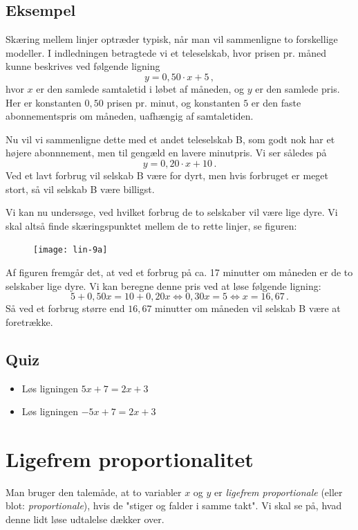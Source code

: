 \documentclass[12pt,oneside,a4paper]{article}
\begin{document}
\subsection{Eksempel}
Skæring mellem linjer optræder typisk, når man vil sammenligne to forskellige
modeller.  I indledningen betragtede vi et teleselskab, hvor prisen pr. måned
kunne beskrives ved følgende ligning
\[
    y = 0,50 \cdot x + 5 \,,
\]
hvor $x$ er den samlede samtaletid i løbet af måneden, og $y$ er den samlede
pris. Her er konstanten $0,50$ prisen pr. minut, og konstanten $5$ er den faste
abonnementspris om måneden, uafhængig af samtaletiden.

Nu vil vi sammenligne dette med et andet teleselskab B, som godt nok har et
højere abonnnement, men til gengæld en lavere minutpris. Vi ser således på
\[
    y = 0,20 \cdot x + 10 \,.
\]
Ved et lavt forbrug vil selskab B være for dyrt, men hvis forbruget er meget stort, så vil
selskab B være billigst.

Vi kan nu undersøge, ved hvilket forbrug de to selskaber vil være lige dyre. Vi skal 
altså finde skæringspunktet mellem de to rette linjer, se figuren:
\begin{figure}[H]
    \centering
    \texttt{[image: lin-9a]}
    \caption{}
\end{figure}
Af figuren fremgår det, at ved et forbrug på ca. 17 minutter om måneden er de
to selskaber lige dyre. Vi kan beregne denne pris ved at løse følgende ligning:
\[
5 + 0,50 x = 10 + 0,20 x \iff 0,30x = 5 \iff x = 16,67 \,.
\]
Så ved et forbrug større end $16,67$ minutter om måneden vil selskab B være at
foretrække.

\subsection{Quiz}
\begin{itemize}
    \item Løs ligningen $5x+7 = 2x+3$
    \item Løs ligningen $-5x+7 = 2x+3$
\end{itemize}



\section{Ligefrem proportionalitet}
Man bruger den talemåde, at to variabler $x$ og $y$ er {\em ligefrem
proportionale} (eller blot: {\em proportionale}), hvis de "stiger og falder i
samme takt". Vi skal se på, hvad denne lidt løse udtalelse dækker over.
\end{document}
